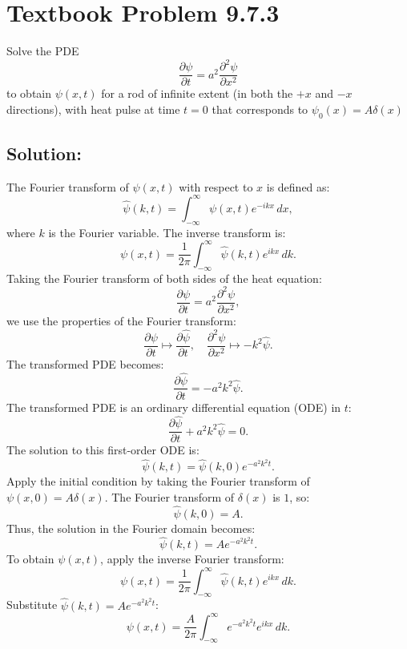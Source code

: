 \documentclass[12pt]{article}
\begin{document}
\section*{Textbook Problem 9.7.3}
    Solve the PDE
    \[
        \frac{\partial \psi}{\partial t} = a^2 \frac{\partial^2 \psi}{\partial x^2}
    \]
    to obtain $\psi(x,t)$ for a rod of infinite extent (in both the $+x$ and $-x$ directions), with heat pulse at time $t=0$ that corresponds to $\psi_0(x) = A \delta(x)$

    \subsection*{Solution:}
        The Fourier transform of \(\psi(x, t)\) with respect to \(x\) is defined as:
        \[
        \hat{\psi}(k, t) = \int_{-\infty}^\infty \psi(x, t) e^{-ikx} \, dx,
        \]
        where \(k\) is the Fourier variable. The inverse transform is:
        \[
        \psi(x, t) = \frac{1}{2\pi} \int_{-\infty}^\infty \hat{\psi}(k, t) e^{ikx} \, dk.
        \]
        Taking the Fourier transform of both sides of the heat equation:
        \[
        \frac{\partial \psi}{\partial t} = a^2 \frac{\partial^2 \psi}{\partial x^2},
        \]
        we use the properties of the Fourier transform:
        \[
        \frac{\partial \psi}{\partial t} \mapsto \frac{\partial \hat{\psi}}{\partial t}, \quad \frac{\partial^2 \psi}{\partial x^2} \mapsto -k^2 \hat{\psi}.
        \]
        The transformed PDE becomes:
        \[
        \frac{\partial \hat{\psi}}{\partial t} = -a^2 k^2 \hat{\psi}.
        \]
        The transformed PDE is an ordinary differential equation (ODE) in \(t\):
        \[
        \frac{\partial \hat{\psi}}{\partial t} + a^2 k^2 \hat{\psi} = 0.
        \]
        The solution to this first-order ODE is:
        \[
        \hat{\psi}(k, t) = \hat{\psi}(k, 0) e^{-a^2 k^2 t}.
        \]
        Apply the initial condition by taking the Fourier transform of \(\psi(x, 0) = A \delta(x)\). The Fourier transform of \(\delta(x)\) is \(1\), so:
        \[
        \hat{\psi}(k, 0) = A.
        \]
        Thus, the solution in the Fourier domain becomes:
        \[
        \hat{\psi}(k, t) = A e^{-a^2 k^2 t}.
        \]
        To obtain \(\psi(x, t)\), apply the inverse Fourier transform:
        \[
        \psi(x, t) = \frac{1}{2\pi} \int_{-\infty}^\infty \hat{\psi}(k, t) e^{ikx} \, dk.
        \]
        Substitute \(\hat{\psi}(k, t) = A e^{-a^2 k^2 t}\):
        \[
        \psi(x, t) = \frac{A}{2\pi} \int_{-\infty}^\infty e^{-a^2 k^2 t} e^{ikx} \, dk.
        \]
\end{document}

